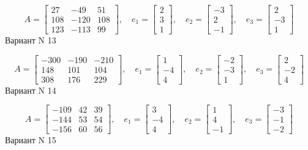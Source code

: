 \documentclass[11pt]{report}
\begin{document}
$$A = \left[\begin{matrix}27 & -49 & 51\\108 & -120 & 108\\123 & -113 & 99\end{matrix}\right],\quad e_1 = \left[\begin{matrix}2\\3\\1\end{matrix}\right],\quad e_2 = \left[\begin{matrix}-3\\2\\-1\end{matrix}\right],\quad e_3 = \left[\begin{matrix}2\\-3\\1\end{matrix}\right]$$Вариант N 13

$$A = \left[\begin{matrix}-300 & -190 & -210\\148 & 101 & 104\\308 & 176 & 229\end{matrix}\right],\quad e_1 = \left[\begin{matrix}1\\-4\\4\end{matrix}\right],\quad e_2 = \left[\begin{matrix}-2\\-3\\1\end{matrix}\right],\quad e_3 = \left[\begin{matrix}2\\-2\\4\end{matrix}\right]$$Вариант N 14

$$A = \left[\begin{matrix}-109 & 42 & 39\\-144 & 53 & 54\\-156 & 60 & 56\end{matrix}\right],\quad e_1 = \left[\begin{matrix}3\\-4\\4\end{matrix}\right],\quad e_2 = \left[\begin{matrix}1\\4\\-1\end{matrix}\right],\quad e_3 = \left[\begin{matrix}-3\\-1\\-2\end{matrix}\right]$$Вариант N 15
\end{document}
